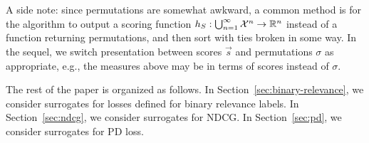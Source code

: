 A side note: since permutations are somewhat awkward, a common method is for
the algorithm to output a scoring function  
$h_S: \bigcup_{n=1}^\infty {\mathcal X}^n \to \mathbb{R}^n$ instead of a function returning
permutations, and then sort with ties broken in some way. In the sequel,
we switch presentation between scores $\vec{s}$ and permutations $\sigma$
as appropriate, e.g., the measures above may be in terms of scores
instead of $\sigma$.

The rest of the paper is organized as follows.
In Section~\ref{sec:binary-relevance}, we consider surrogates for losses
defined for binary relevance labels.
In Section~\ref{sec:ndcg}, we consider surrogates for NDCG.
In Section~\ref{sec:pd}, we consider surrogates for PD loss.
